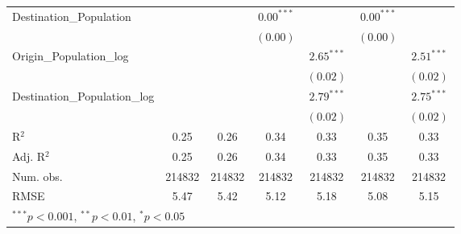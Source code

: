 \begin{table}
\begin{center}
\begin{tabular}{l c c c c c c }
			Destination\_Population      &               &               & $0.00^{***}$  &                & $0.00^{***}$  &                \\
			&               &               & $(0.00)$      &                & $(0.00)$      &                \\
			Origin\_Population\_log      &               &               &               & $2.65^{***}$   &               & $2.51^{***}$   \\
			&               &               &               & $(0.02)$       &               & $(0.02)$       \\
			Destination\_Population\_log &               &               &               & $2.79^{***}$   &               & $2.75^{***}$   \\
			&               &               &               & $(0.02)$       &               & $(0.02)$       \\
			\hline
			R$^2$                        & 0.25          & 0.26          & 0.34          & 0.33           & 0.35          & 0.33           \\
			Adj. R$^2$                   & 0.25          & 0.26          & 0.34          & 0.33           & 0.35          & 0.33           \\
			Num. obs.                    & 214832        & 214832        & 214832        & 214832         & 214832        & 214832         \\
			RMSE                         & 5.47          & 5.42          & 5.12          & 5.18           & 5.08          & 5.15           \\
			\hline
			\multicolumn{7}{l}{\scriptsize{$^{***}p<0.001$, $^{**}p<0.01$, $^*p<0.05$}}
		\end{tabular}
		\label{table:GravityModel2016Q2}
	\end{center}
\end{table}


